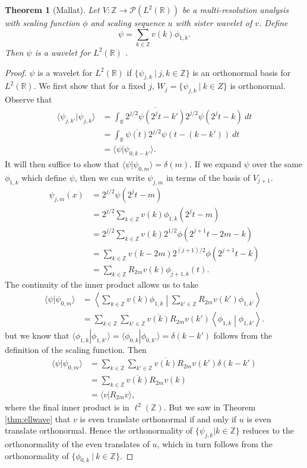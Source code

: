 \documentclass{report}
\newtheorem{thm:Mallat}[thm:ellwave]{Theorem}
\newcommand{\Z}{\mathbb{Z}}
\newcommand{\R}{\mathbb{R}}
\newcommand{\pow}{\mathcal{P}}
\begin{document}
\begin{thm:Mallat}[Mallat]
\label{thm:Mallat}
Let $V:\Z \to \pow( L^2 (\R ))$ be a multi-resolution analysis with scaling function $\phi$ and scaling sequence $u$ with sister wavelet of $v$. Define
$$
\psi=\sum_{k \in \Z} v(k)\phi_{1,k}.
$$
Then $\psi$ is a wavelet for $L^2 (\R)$ .
\end{thm:Mallat}
\begin{proof}
$\psi$ is a wavelet for $L^2 (\R)$ if $\{ \psi_{j,k} \  | \  j,k \in \Z \}$ is an orthonormal basis for $L^2 (\R )$.
We first show that for a fixed $j$, $W_j=\{\psi_{j,k} \ | \ k \in Z\}$ is orthonormal. Observe that
\begin{align*}
\langle \psi_{j,k'} | \psi_{j,k} \rangle &= \int_\R \overline{2^{j/2}\psi(2^jt-k')} 2^{j/2}\psi(2^jt-k) \ dt\\
&= \int_\R \overline{\psi(t)} 2^{j/2}\psi(t-(k-k')) \ dt \\
&=\langle \psi | \psi_{0,k-k'} \rangle .
\end{align*}
It will then suffice to show that $\langle \psi | \psi_{0,m}\rangle=\delta(m) $. If we expand $\psi$ over the same $\phi_{1,k}$ which define $\psi$, then we can write $\psi_{j,m}$ in terms of the basis of $V_{j+1}$.
\begin{align*}
\psi_{j,m}(x)&=2^{j/2}\psi(2^jt-m)\\
&=2^{j/2} \sum_{k \in \Z} v(k)\phi_{1,k}(2^jt-m)\\
&=2^{j/2} \sum_{k \in \Z} v(k) 2^{1/2}\phi(2^{j+1}t-2m-k)\\
&=\sum_{k \in \Z} v(k-2m)2^{(j+1)/2}\phi(2^{j+1}t-k)\\
&=\sum_{k \in \Z} R_{2m}v(k)\phi_{j+1,k}(t).
\end{align*}
The continuity of the inner product allows us to take
\begin{align*}
\langle \psi | \psi_{0,m}\rangle &=\left \langle \sum_{k\in \Z} v(k)\phi_{1,k}\middle | \sum_{k'\in \Z} R_{2m}v(k')\phi_{1,k'} \right \rangle\\
&= \sum_{k\in \Z} \sum_{k'\in \Z} \overline{ v(k)} R_{2m}v(k') \left \langle\phi_{1,k}\middle | \phi_{1,k'} \right \rangle.
\end{align*}
but we know that $\langle \phi_{1,k} | \phi_{1,k'} \rangle=\langle \phi_{0,k} | \phi_{0,k'}\rangle=\delta(k-k')$ follows from the definition of the scaling function. Then
\begin{align*}
\langle \psi | \psi_{0,m}\rangle &= \sum_{k\in \Z} \sum_{k'\in \Z} \overline{ v(k)} R_{2m}v(k') \delta(k-k')\\
&= \sum_{k\in \Z} \overline{ v(k)} R_{2m}v(k) \\
&= \langle v | R_{2m} v \rangle,
\end{align*}
where  the final inner product is in $\ell^2 (\Z)$. But we saw in Theorem \ref{thm:ellwave} that $v$ is even translate orthonormal if and only if  $u$  is even translate orthonormal. Hence the orthonormality of $\{\psi_{j,k}|k\in \Z\}$ reduces to the orthonormality of the even translates of $u$, which in turn follows from the orthonormality of $\{\phi_{0,k} \ | \ k\in \Z\}$.


\end{proof}
\end{document}
